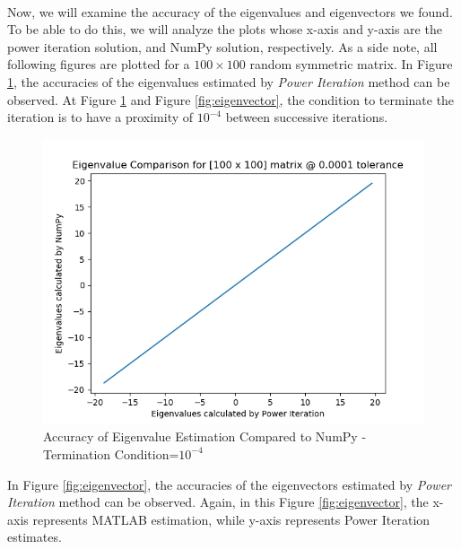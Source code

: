 \documentclass[letterpaper,12pt]{article}
\begin{document}
   \paragraph{}Now, we will examine the accuracy of the eigenvalues and eigenvectors we found. To be able to do this, we will analyze the plots whose x-axis and y-axis are the power iteration solution, and NumPy solution, respectively. As a side note, all following figures are plotted for a $100 \times 100$ random symmetric matrix. In Figure \ref{fig:eigenvalue}, the accuracies of the eigenvalues estimated by \textit{Power Iteration} method can be observed. At Figure \ref{fig:eigenvalue} and Figure \ref{fig:eigenvector}, the condition to terminate the iteration is to have a proximity of $10^{-4}$ between successive iterations.
\begin{figure}[H] 
   \centering \includegraphics[width=0.7\columnwidth]{figures/eigenvalue.png}           
                  \caption{Accuracy of Eigenvalue Estimation Compared to NumPy - Termination Condition=$10^{-4}$}                
                     \label{fig:eigenvalue}
   \end{figure}  
   In Figure \ref{fig:eigenvector}, the accuracies of the eigenvectors estimated by \textit{Power Iteration} method can be observed. Again, in this Figure \ref{fig:eigenvector}, the x-axis represents MATLAB estimation, while y-axis represents Power Iteration estimates.
\end{document}
